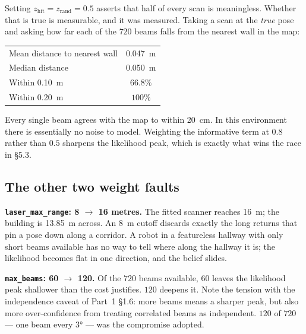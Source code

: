 \documentclass[11pt,a4paper]{report}
\newcommand{\file}[1]{\texttt{\small #1}}
\begin{document}
\begin{warnbox}[Why $z_{\text{hit}}+z_{\text{rand}} = 0.5/0.5$ was wrong here]
Setting $z_{\text{hit}} = z_{\text{rand}} = 0.5$ asserts that half of every
scan is meaningless. Whether that is true is measurable, and it was measured.
Taking a scan at the \emph{true} pose and asking how far each of the $720$
beams falls from the nearest wall in the map:

\begin{center}
\begin{tabular}{@{}lc@{}}
\toprule
Mean distance to nearest wall & \SI{0.047}{\metre} \\
Median distance               & \SI{0.050}{\metre} \\
Within \SI{0.10}{\metre}      & $66.8\%$ \\
Within \SI{0.20}{\metre}      & $100\%$ \\
\bottomrule
\end{tabular}
\end{center}

Every single beam agrees with the map to within \SI{20}{\centi\metre}. In this
environment there is essentially no noise to model. Weighting the informative
term at $0.8$ rather than $0.5$ sharpens the likelihood peak, which is exactly
what wins the race in \S5.3.
\end{warnbox}

\subsection{The other two weight faults}

\textbf{\file{laser\_max\_range}: 8 $\rightarrow$ 16 metres.} The fitted
scanner reaches \SI{16}{\metre}; the building is \SI{13.85}{\metre} across. An
\SI{8}{\metre} cutoff discards exactly the long returns that pin a pose down
along a corridor. A robot in a featureless hallway with only short beams
available has no way to tell where along the hallway it is; the likelihood
becomes flat in one direction, and the belief slides.

\smallskip
\textbf{\file{max\_beams}: 60 $\rightarrow$ 120.} Of the $720$ beams
available, $60$ leaves the likelihood peak shallower than the cost justifies.
$120$ deepens it. Note the tension with the independence caveat of Part~1
\S1.6: more beams means a sharper peak, but also more over-confidence from
treating correlated beams as independent. $120$ of $720$ --- one beam every
\ang{3} --- was the compromise adopted.
\end{document}

